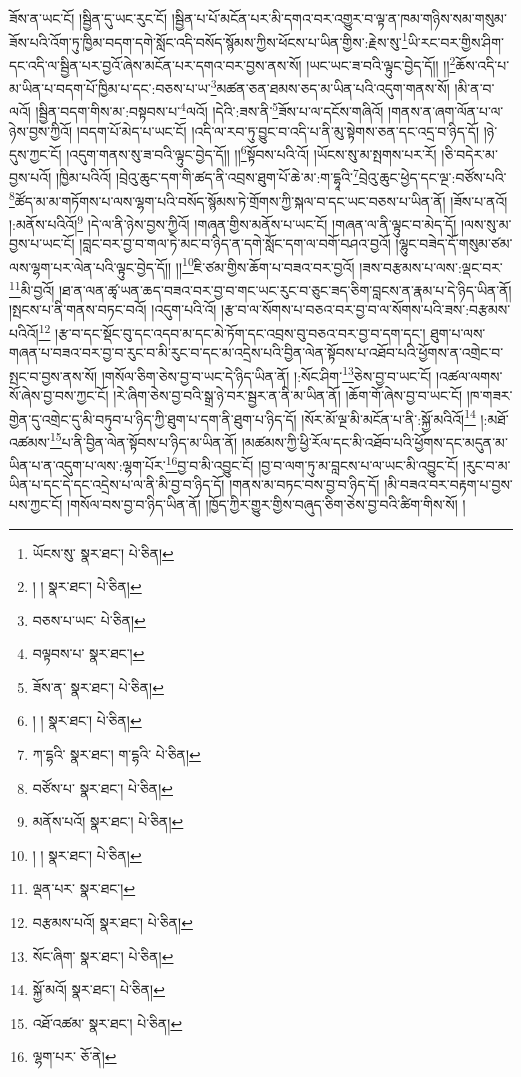 ཟོས་ན་ཡང་ངོ། །སྦྱིན་དུ་ཡང་རུང་ངོ། །སྦྱིན་པ་པོ་མངོན་པར་མི་དགའ་བར་འགྱུར་བ་ལྟ་ན་ཁམ་གཉིས་སམ་གསུམ་ཟོས་པའི་འོག་ཏུ་ཁྱིམ་བདག་དགེ་སློང་འདི་བསོད་སྙོམས་ཀྱིས་ཕོངས་པ་ཡིན་གྱིས་:རྗེས་སུ་\footnote{ཡོངས་སུ་  སྣར་ཐང་།  པེ་ཅིན། }ཡི་རང་བར་གྱིས་ཤིག་དང་འདི་ལ་སྦྱིན་པར་བྱའོ་ཞེས་མངོན་པར་དགའ་བར་བྱས་ནས་སོ། །ཡང་ཡང་ཟ་བའི་ལྟུང་བྱེད་དོ།། །།\footnote{། །  སྣར་ཐང་།  པེ་ཅིན། }ཆོས་འདི་པ་མ་ཡིན་པ་བདག་པོ་ཁྱིམ་པ་དང་:བཅས་པ་ཡ་\footnote{བཅས་པ་ཡང་  པེ་ཅིན། }མཚན་ཅན་ཐམས་ཅད་མ་ཡིན་པའི་འདུག་གནས་སོ། །མི་ན་བ་ལའོ། །སྦྱིན་བདག་གིས་མ་:བསྟབས་པ་\footnote{བལྟབས་པ་  སྣར་ཐང་། }ལའོ། །དེའི་:ཟས་ནི་\footnote{ཟོས་ན་  སྣར་ཐང་།  པེ་ཅིན། }ཟོས་པ་ལ་དངོས་གཞིའོ། །གནས་ན་ཞག་ལོན་པ་ལ་ཉེས་བྱས་ཀྱིའོ། །བདག་པོ་མེད་པ་ཡང་ངོ། །འདི་ལ་རབ་ཏུ་བྱུང་བ་འདི་པ་ནི་མུ་སྟེགས་ཅན་དང་འདྲ་བ་ཉིད་དོ། །ཉེ་དུས་ཀྱང་ངོ། །འདུག་གནས་སུ་ཟ་བའི་ལྟུང་བྱེད་དོ།། །།\footnote{། །  སྣར་ཐང་།  པེ་ཅིན། }སྟོབས་པའི་འོ། །ཡོངས་སུ་མ་སྤགས་པར་རོ། །ཅི་བདེར་མ་བྱས་པའོ། །ཁྱིམ་པའིའོ། །བྲེའུ་ཆུང་དག་གི་ཚད་ནི་འབྲས་ཐུག་པོ་ཆེ་མ་:ག་དྷཱའི་\footnote{ཀ་དྷའི་  སྣར་ཐང་། ག་དྷའི་  པེ་ཅིན། }བྲེའུ་ཆུང་ཕྱེད་དང་ལྔ་:བཙོས་པའི་\footnote{བཙོས་པ་  སྣར་ཐང་།  པེ་ཅིན། }ཚོད་མ་མ་གཏོགས་པ་ལས་ལྷག་པའི་བསོད་སྙོམས་ཏེ་གྲོགས་ཀྱི་སྐལ་བ་དང་ཡང་བཅས་པ་ཡིན་ནོ། །ཟོས་པ་ནའོ། །:མནོས་པའིའོ།\footnote{མནོས་པའོ།  སྣར་ཐང་།  པེ་ཅིན། } །དེ་ལ་ནི་ཉེས་བྱས་ཀྱིའོ། །གཞན་གྱིས་མནོས་པ་ཡང་ངོ། །གཞན་ལ་ནི་ལྟུང་བ་མེད་དོ། །ལས་སུ་མ་བྱས་པ་ཡང་ངོ། །བླང་བར་བྱ་བ་གལ་ཏེ་མང་བ་ཉིད་ན་དགེ་སློང་དག་ལ་བགོ་བཤའ་བྱའོ། །ལྷུང་བཟེད་དོ་གསུམ་ཙམ་ལས་ལྷག་པར་ལེན་པའི་ལྟུང་བྱེད་དོ།། །།\footnote{། །  སྣར་ཐང་།  པེ་ཅིན། }ཇི་ཙམ་གྱིས་ཆོག་པ་བཟའ་བར་བྱའོ། །ཟས་བརྩམས་པ་ལས་:ལྡང་བར་\footnote{ལྡན་པར་  སྣར་ཐང་། }མི་བྱའོ། །ཐ་ན་ལན་ཚྭ་ཡན་ཆད་བཟའ་བར་བྱ་བ་གང་ཡང་རུང་བ་ཅུང་ཟད་ཅིག་བླངས་ན་རྣམ་པ་དེ་ཉིད་ཡིན་ནོ། །སྤངས་པ་ནི་གནས་བཏང་བའོ། །འདུག་པའི་འོ། །རྩ་བ་ལ་སོགས་པ་བཅའ་བར་བྱ་བ་ལ་སོགས་པའི་ཟས་:བརྩམས་པའིའོ།\footnote{བརྩམས་པའོ།  སྣར་ཐང་།  པེ་ཅིན། } །རྩ་བ་དང་སྡོང་བུ་དང་འདབ་མ་དང་མེ་ཏོག་དང་འབྲས་བུ་བཅའ་བར་བྱ་བ་དག་དང་། ཐུག་པ་ལས་གཞན་པ་བཟའ་བར་བྱ་བ་རུང་བ་མི་རུང་བ་དང་མ་འདྲེས་པའི་བྱིན་ལེན་སྟོབས་པ་འཐོབ་པའི་ཕྱོགས་ན་འགྲེང་བ་སྤང་བ་བྱས་ནས་སོ། །གསོལ་ཅིག་ཅེས་བྱ་བ་ཡང་དེ་ཉིད་ཡིན་ནོ། །:སོང་ཤིག་\footnote{སོང་ཞིག་  སྣར་ཐང་།  པེ་ཅིན། }ཅེས་བྱ་བ་ཡང་ངོ། །འཚལ་ལགས་སོ་ཞེས་བྱ་བས་ཀྱང་ངོ། །རེ་ཞིག་ཅེས་བྱ་བའི་སྒྲ་ཉེ་བར་སྦྱར་ན་ནི་མ་ཡིན་ནོ། །ཆོག་གོ་ཞེས་བྱ་བ་ཡང་ངོ། །ཁ་གཟར་གྱེན་དུ་འགྲེང་དུ་མི་བཏུབ་པ་ཉིད་ཀྱི་ཐུག་པ་དག་ནི་ཐུག་པ་ཉིད་དོ། །སོར་མོ་ལྔ་མི་མངོན་པ་ནི་:སྐྱོ་མའིའོ།\footnote{སྐྱོ་མའོ།  སྣར་ཐང་།  པེ་ཅིན། } །:མཐོ་འཚམས་\footnote{འཐོ་འཚམ་  སྣར་ཐང་།  པེ་ཅིན། }པ་ནི་བྱིན་ལེན་སྟོབས་པ་ཉིད་མ་ཡིན་ནོ། །མཚམས་ཀྱི་ཕྱི་རོལ་དང་མི་འཐོབ་པའི་ཕྱོགས་དང་མདུན་མ་ཡིན་པ་ན་འདུག་པ་ལས་:ལྷག་པོར་\footnote{ལྷག་པར་  ཅོ་ནེ། }བྱ་བ་མི་འབྱུང་ངོ། །བྱ་བ་ལག་ཏུ་མ་བླངས་པ་ལ་ཡང་མི་འབྱུང་ངོ། །རུང་བ་མ་ཡིན་པ་དང་དེ་དང་འདྲེས་པ་ལ་ནི་མི་བྱ་བ་ཉིད་དོ། །གནས་མ་བཏང་བས་བྱ་བ་ཉིད་དོ། །མི་བཟའ་བར་བརྟག་པ་བྱས་པས་ཀྱང་ངོ། །གསོལ་བས་བྱ་བ་ཉིད་ཡིན་ནོ། །ཁྱོད་ཀྱིར་གྱུར་གྱིས་བཞུད་ཅིག་ཅེས་བྱ་བའི་ཚིག་གིས་སོ། །
